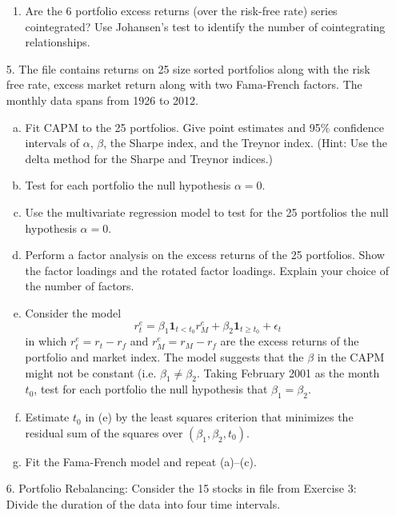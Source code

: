 \begin{enumerate}
\begin{enumerate}
	\item Are the 6 portfolio excess returns (over the risk-free rate) series cointegrated? Use Johansen's test to identify the number of cointegrating relationships.
	\end{enumerate}


\item[5.] The file  contains returns on 25 size sorted portfolios along with the risk free rate, excess market return along with two Fama-French factors. The monthly data spans from 1926 to 2012.
	\begin{enumerate}[(a)]
	\item Fit CAPM to the 25 portfolios. Give point estimates and 95\% confidence intervals of $\alpha$, $\beta$, the Sharpe index, and the Treynor index. (Hint: Use the delta method for the Sharpe and Treynor indices.)
	\item Test for each portfolio the null hypothesis $\alpha=0$.
	\item Use the multivariate regression model to test for the 25 portfolios the null hypothesis $\alpha=0$.
	\item Perform a factor analysis on the excess returns of the 25 portfolios. Show the factor loadings and the rotated factor loadings. Explain your choice of the number of factors.
	\item Consider the model
		\[
		r_t^e= \beta_1 \mathbf{1}_{t<t_0} r_M^e + \beta_2 \mathbf{1}_{t\geq t_0} + \epsilon_t
		\]
	in which $r_t^e=r_t-r_f$ and $r_M^e=r_M-r_f$ are the excess returns of the portfolio and market index. The model suggests that the $\beta$ in the CAPM might not be constant (i.e. $\beta_1\neq\beta_2$. Taking February 2001 as the month $t_0$, test for each portfolio the null hypothesis that $\beta_1=\beta_2$.
	\item Estimate $t_0$ in (e) by the least squares criterion that minimizes the residual sum of the squares over $(\beta_1,\beta_2,t_0)$.
	\item Fit the Fama-French model and repeat (a)--(c). 
	\end{enumerate}




\item[6.] Portfolio Rebalancing: Consider the 15 stocks in file from Exercise 3: Divide the duration of the data into four time intervals.


\end{enumerate}
